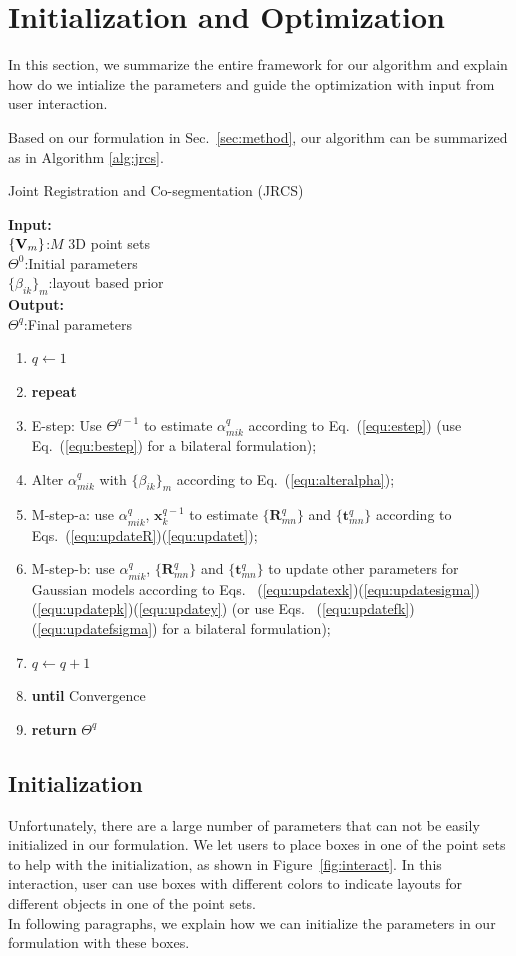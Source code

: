 \section{Initialization and Optimization}
\label{sec:imp}
In this section, we summarize the entire framework for our algorithm and explain how do we intialize the parameters and guide the optimization with input from user interaction.

Based on our formulation in Sec.~\ref{sec:method}, our algorithm can be summarized as in Algorithm \ref{alg:jrcs}.
\begin{algorithm}[htb]
	\caption{Joint Registration and Co-segmentation (JRCS)}
	\label{alg:jrcs}
	\textbf{Input:}~~\\
	$\{\mathbf{V}_m\}$:$M$ 3D point sets\\
	$\Theta^0$:Initial parameters\\
	$\{\beta_{ik}\}_{m}$:layout based prior\\
	\textbf{Output:}~~\\
	$\Theta^q$:Final parameters~~
	\begin{enumerate}
		\item $q\leftarrow1$
		\item \textbf{repeat}
		\item E-step: Use $\Theta^{q-1}$ to estimate $\alpha_{mik}^q$ according to Eq.~(\ref{equ:estep}) (use Eq.~(\ref{equ:bestep}) for a bilateral formulation);
		\item Alter $\alpha_{mik}^q$ with $\{\beta_{ik}\}_{m}$ according to Eq.~(\ref{equ:alteralpha});
		\item M-step-a: use $\alpha^q_{mik}$, $\mathbf x^{q-1}_k$ to estimate $\{\mathbf{R}_{mn}^q\}$ and $\{\mathbf t_{mn}^q\}$ according to Eqs.~(\ref{equ:updateR})(\ref{equ:updatet});
		\item M-step-b: use $\alpha^q_{mik}$, $\{\mathbf{R}_{mn}^q\}$ and $\{\mathbf{t}_{mn}^q\}$ to update other parameters for Gaussian models according to Eqs.~ (\ref{equ:updatexk})(\ref{equ:updatesigma})(\ref{equ:updatepk})(\ref{equ:updatey})  (or use Eqs.~ (\ref{equ:updatefk})(\ref{equ:updatefsigma}) for a bilateral formulation);
		\item $q \leftarrow q+1$
		\item \textbf{until} Convergence 
		\item \textbf{return} $\Theta^q$
	\end{enumerate}
\end{algorithm}
\subsection{Initialization}
\label{sec:imp:interact}
Unfortunately, there are a large number of parameters that can not be easily initialized in our formulation. We let users to place boxes in one of the point sets to help with the initialization, as shown in Figure~\ref{fig:interact}. In this interaction, user can use boxes with different colors to indicate layouts for different objects in one of the point sets.\\
In following paragraphs, we explain how we can initialize the parameters in our formulation with these boxes.


